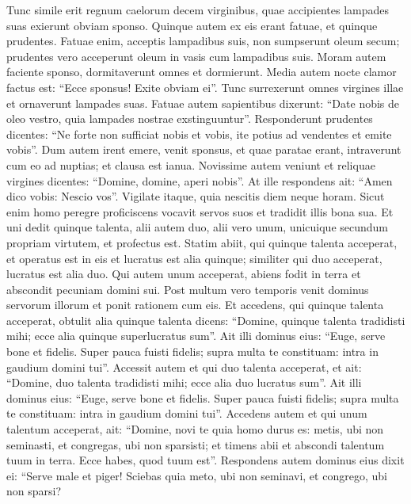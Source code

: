 \begin{biblechapter}  
\verse Tunc simile erit regnum caelorum decem virginibus, quae accipientes lampades suas exierunt obviam sponso. 
\verse Quinque autem ex eis erant fatuae, et quinque prudentes. 
\verse Fatuae enim, acceptis lampadibus suis, non sumpserunt oleum secum; 
\verse prudentes vero acceperunt oleum in vasis cum lampadibus suis. 
\verse Moram autem faciente sponso, dormitaverunt omnes et dormierunt. 
\verse Media autem nocte clamor factus est: “Ecce sponsus! Exite obviam ei”. 
\verse Tunc surrexerunt omnes virgines illae et ornaverunt lampades suas. 
\verse Fatuae autem sapientibus dixerunt: “Date nobis de oleo vestro, quia lampades nostrae exstinguuntur”. 
\verse Responderunt prudentes dicentes: “Ne forte non sufficiat nobis et vobis, ite potius ad vendentes et emite vobis”.  
\verse Dum autem irent emere, venit sponsus, et quae paratae erant, intraverunt cum eo ad nuptias; et clausa est ianua. 
\verse Novissime autem veniunt et reliquae virgines dicentes: “Domine, domine, aperi nobis”. 
\verse At ille respondens ait: “Amen dico vobis: Nescio vos”. 
\verse Vigilate itaque, quia nescitis diem neque horam. 
\verse Sicut enim homo peregre proficiscens vocavit servos suos et tradidit illis bona sua. 
\verse Et uni dedit quinque talenta, alii autem duo, alii vero unum, unicuique secundum propriam virtutem, et profectus est. Statim 
\verse abiit, qui quinque talenta acceperat, et operatus est in eis et lucratus est alia quinque; 
\verse similiter qui duo acceperat, lucratus est alia duo. 
\verse Qui autem unum acceperat, abiens fodit in terra et abscondit pecuniam domini sui. 
\verse Post multum vero temporis venit dominus servorum illorum et ponit rationem cum eis. 
\verse Et accedens, qui quinque talenta acceperat, obtulit alia quinque talenta dicens: “Domine, quinque talenta tradidisti mihi; ecce alia quinque superlucratus sum”. 
\verse Ait illi dominus eius: “Euge, serve bone et fidelis. Super pauca fuisti fidelis; supra multa te constituam: intra in gaudium domini tui”. 
\verse Accessit autem et qui duo talenta acceperat, et ait: “Domine, duo talenta tradidisti mihi; ecce alia duo lucratus sum”. 
\verse Ait illi dominus eius: “Euge, serve bone et fidelis. Super pauca fuisti fidelis; supra multa te constituam: intra in gaudium domini tui”. 
\verse Accedens autem et qui unum talentum acceperat, ait: “Domine, novi te quia homo durus es: metis, ubi non seminasti, et congregas, ubi non sparsisti; 
\verse et timens abii et abscondi talentum tuum in terra. Ecce habes, quod tuum est”. 
\verse Respondens autem dominus eius dixit ei: “Serve male et piger! Sciebas quia meto, ubi non seminavi, et congrego, ubi non sparsi? 

\end{biblechapter}
